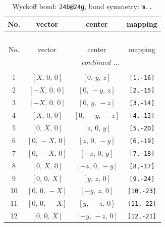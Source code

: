 \documentclass[fleqn,8pt]{jsarticle}
\begin{document}
\begin{longtable}{cccc}
\caption{Wyckoff bond: {\tt 24b@24g}, bond symmetry: {\tt m..}}
 \\
 \hline \hline
No. & vector & center & mapping \\ \hline \endfirsthead

\multicolumn{3}{l}{\tablename\ \thetable{}} \\
 \hline \hline
No. & vector & center & mapping \\ \hline \endhead

 \hline \hline
\multicolumn{3}{r}{\footnotesize\it continued ...} \\ \endfoot

 \hline \hline
\multicolumn{3}{r}{} \\ \endlastfoot

1 & $\left[ X,\, 0,\, 0 \right]$ & $\left[ 0,\, y,\, z \right]$ & {\tt [1,-16]} \\ \hline
2 & $\left[ - X,\, 0,\, 0 \right]$ & $\left[ 0,\, - y,\, z \right]$ & {\tt [2,-15]} \\ \hline
3 & $\left[ - X,\, 0,\, 0 \right]$ & $\left[ 0,\, y,\, - z \right]$ & {\tt [3,-14]} \\ \hline
4 & $\left[ X,\, 0,\, 0 \right]$ & $\left[ 0,\, - y,\, - z \right]$ & {\tt [4,-13]} \\ \hline
5 & $\left[ 0,\, X,\, 0 \right]$ & $\left[ z,\, 0,\, y \right]$ & {\tt [5,-20]} \\ \hline
6 & $\left[ 0,\, - X,\, 0 \right]$ & $\left[ z,\, 0,\, - y \right]$ & {\tt [6,-19]} \\ \hline
7 & $\left[ 0,\, - X,\, 0 \right]$ & $\left[ - z,\, 0,\, y \right]$ & {\tt [7,-18]} \\ \hline
8 & $\left[ 0,\, X,\, 0 \right]$ & $\left[ - z,\, 0,\, - y \right]$ & {\tt [8,-17]} \\ \hline
9 & $\left[ 0,\, 0,\, X \right]$ & $\left[ y,\, z,\, 0 \right]$ & {\tt [9,-24]} \\ \hline
10 & $\left[ 0,\, 0,\, - X \right]$ & $\left[ - y,\, z,\, 0 \right]$ & {\tt [10,-23]} \\ \hline
11 & $\left[ 0,\, 0,\, - X \right]$ & $\left[ y,\, - z,\, 0 \right]$ & {\tt [11,-22]} \\ \hline
12 & $\left[ 0,\, 0,\, X \right]$ & $\left[ - y,\, - z,\, 0 \right]$ & {\tt [12,-21]} \\
\end{longtable}
\renewcommand{\arraystretch}{1.2}
\end{document}
